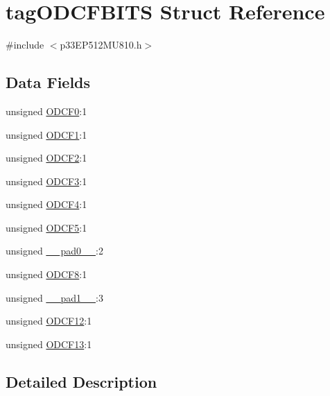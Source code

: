 \hypertarget{structtag_o_d_c_f_b_i_t_s}{}\section{tag\+O\+D\+C\+F\+B\+I\+TS Struct Reference}
\label{structtag_o_d_c_f_b_i_t_s}


{\ttfamily \#include $<$p33\+E\+P512\+M\+U810.\+h$>$}

\subsection*{Data Fields}
\begin{DoxyCompactItemize}
\item 
unsigned \hyperlink{structtag_o_d_c_f_b_i_t_s_aa94ab6a66bf842cab402b551bf39a5a9}{O\+D\+C\+F0}\+:1
\item 
unsigned \hyperlink{structtag_o_d_c_f_b_i_t_s_ad8c2bd68d54c67993ea787bd0f984537}{O\+D\+C\+F1}\+:1
\item 
unsigned \hyperlink{structtag_o_d_c_f_b_i_t_s_ad3274bb99024e56c2bc864623c7c3f0b}{O\+D\+C\+F2}\+:1
\item 
unsigned \hyperlink{structtag_o_d_c_f_b_i_t_s_aa0e189e2726769b9cb5faf9b1131992b}{O\+D\+C\+F3}\+:1
\item 
unsigned \hyperlink{structtag_o_d_c_f_b_i_t_s_a1bc38367ec2b1c574670e95bee56fc1f}{O\+D\+C\+F4}\+:1
\item 
unsigned \hyperlink{structtag_o_d_c_f_b_i_t_s_a9dd65df871db8e2bd2459654ebbf14b7}{O\+D\+C\+F5}\+:1
\item 
unsigned \hyperlink{structtag_o_d_c_f_b_i_t_s_adf71f3d8410c1f1dbbc96680a92c49af}{\+\_\+\+\_\+pad0\+\_\+\+\_\+}\+:2
\item 
unsigned \hyperlink{structtag_o_d_c_f_b_i_t_s_aa8e9d32dd3b14d6d2bc46845bd6e0f3b}{O\+D\+C\+F8}\+:1
\item 
unsigned \hyperlink{structtag_o_d_c_f_b_i_t_s_acaf2d0924a107ec6e8d2e31febaf66f9}{\+\_\+\+\_\+pad1\+\_\+\+\_\+}\+:3
\item 
unsigned \hyperlink{structtag_o_d_c_f_b_i_t_s_a54ba87597aeb45eb233bd809e2fe775d}{O\+D\+C\+F12}\+:1
\item 
unsigned \hyperlink{structtag_o_d_c_f_b_i_t_s_a2f707a2f8a97b8998f0d834cfdcf675f}{O\+D\+C\+F13}\+:1
\end{DoxyCompactItemize}


\subsection{Detailed Description}


